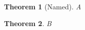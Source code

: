 \documentclass{article}
\newtheorem{theorem}{Theorem}
\begin{document}
\listoftheorems
\begin{theorem}[Named]A\end{theorem}
\begin{theorem}B\end{theorem}
\end{document}
